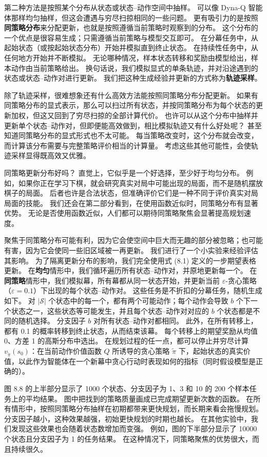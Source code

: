 \documentclass[UTF8,12pt,a4paper,fontset=fandol]{ctexart}
\begin{document}
第二种方法是按照某个分布从状态或状态--动作空间中抽样。
可以像 Dyna-Q 智能体那样均匀抽样，但这会遭遇与穷尽扫掠相同的一些问题。
更有吸引力的是按照\textbf{同策略分布}来分配更新，也就是按照遵循当前策略时观察到的分布。
这个分布的一个优点是很容易生成；只需遵循当前策略与模型交互即可。
在分幕任务中，从起始状态（或按起始状态分布）开始并模拟直到终止状态。
在持续性任务中，从任何地方开始并不断模拟。
无论哪种情况，样本状态转移和奖励由模型给出，样本动作由当前策略给出。
换句话说，我们模拟显式的单条轨迹，并对沿途遇到的状态或状态--动作对进行更新。
我们把这种生成经验并更新的方式称为\textbf{轨迹采样}。

除了轨迹采样，很难想象还有什么高效方法能按照同策略分布分配更新。
如果有同策略分布的显式表示，那么可以扫过所有状态，并按同策略分布为每个状态的更新加权，但这又回到了穷尽扫掠的全部计算代价。
也许可以从这个分布中抽样并更新单个状态--动作对，但即便能高效做到，相比模拟轨迹又有什么好处呢？
甚至知道同策略分布的显式形式也不太可能。
每当策略改变时，这个分布就会改变，而计算该分布需要与完整策略评价相当的计算量。
考虑这些其他可能性，会使轨迹采样显得既高效又优雅。

同策略更新分布好吗？
直觉上，它似乎是一个好选择，至少好于均匀分布。
例如，如果你正在学习下棋，就会研究真实对局中可能出现的局面，而不是随机摆放棋子的局面。
后者也许是合法状态，但准确评价它们是一种不同于评价真实对局局面的技能。
我们还会在第二部分看到，在使用函数近似时，同策略分布有显著优势。
无论是否使用函数近似，人们都可以期待同策略聚焦会显著提高规划速度。

聚焦于同策略分布可能有利，因为它会使空间中巨大而无趣的部分被忽略；也可能有害，因为它会使同一些旧区域被一再更新。
我们进行了一个小实验来经验评估其影响。
为了隔离更新分布的影响，我们完全使用式 (8.1) 定义的一步期望表格更新。
在\textbf{均匀}情形中，我们循环遍历所有状态--动作对，并原地更新每一个。
在\textbf{同策略}情形中，我们模拟幕，所有幕都从同一状态开始，并更新当前 $\varepsilon$-贪心策略（$\varepsilon=0.1$）下出现的每个状态--动作对。
这些任务是不折扣的分幕任务，随机生成如下。
对 $|\mathcal{S}|$ 个状态中的每一个，都有两个可能动作；每个动作会导致 $b$ 个下一个状态之一，这些状态等可能发生，并且每个状态--动作对对应的 $b$ 个状态都是不同的随机选择。
分支因子 $b$ 对所有状态--动作对都相同。
此外，在所有转移上，都有 0.1 的概率转移到终止状态，从而结束该幕。
每个转移上的期望奖励从均值 0、方差 1 的高斯分布中选出。
在规划过程的任一点，都可以停止并穷尽计算 $v_{\tilde\pi}(s_0)$：在当前动作价值函数 $Q$ 所诱导的贪心策略 $\tilde\pi$ 下，起始状态的真实价值，以此作为智能体在一个新幕中贪心行动时表现如何的指标（同时假设模型是正确的）。

图 8.8 的上半部分显示了 1000 个状态、分支因子为 1、3 和 10 的 200 个样本任务上的平均结果。
图中把找到的策略质量画成已完成期望更新次数的函数。
在所有情形中，按照同策略分布抽样在初期都带来更快规划，而长期来看会拖慢规划。
分支因子越小，这种效果越强，初始更快规划的时期也越长。
在其他实验中，我们发现这些效果也会随着状态数增加而变强。
例如，图的下半部分显示了 10000 个状态且分支因子为 1 的任务结果。
在这种情况下，同策略聚焦的优势很大，而且持续很久。
\end{document}
